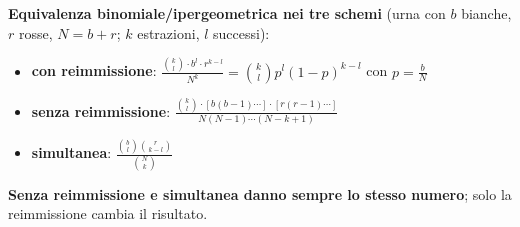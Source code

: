 \documentclass[12pt]{extarticle} %
\begin{document}
\vspace{0.3cm}
\textbf{Equivalenza binomiale/ipergeometrica nei tre schemi} (urna con $b$ bianche, $r$ rosse, $N = b+r$; $k$ estrazioni, $l$ successi):
\begin{itemize}[-]
    \item \textbf{con reimmissione}: $\displaystyle \frac{\binom{k}{l} \cdot b^l \cdot r^{k-l}}{N^k} = \binom{k}{l} p^l (1-p)^{k-l}$ \quad con $p = \frac{b}{N}$
    \item \textbf{senza reimmissione}: $\displaystyle \frac{\binom{k}{l} \cdot [b(b-1)\cdots] \cdot [r(r-1)\cdots]}{N(N-1)\cdots(N-k+1)}$ 
    \item \textbf{simultanea}: $\displaystyle \frac{\binom{b}{l}\binom{r}{k-l}}{\binom{N}{k}}$
\end{itemize}
{\footnotesize \textbf{Senza reimmissione e simultanea danno sempre lo stesso numero}; solo la reimmissione cambia il risultato.}

\vspace{0.5cm}
\end{document}

